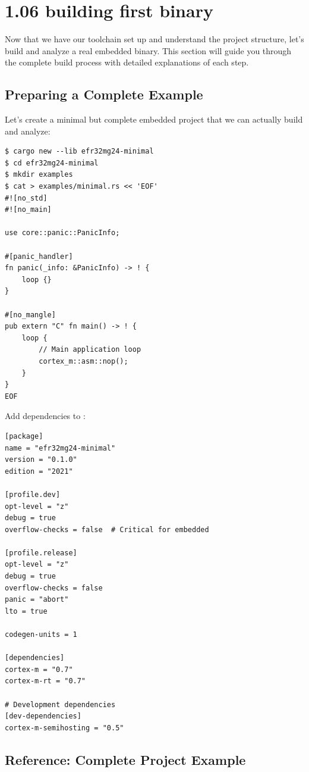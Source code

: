 \section{1.06 building first binary}
\label{sec:1.06 building first binary}


Now that we have our toolchain set up and understand the project structure, let's build and analyze a real embedded binary. This section will guide you through the complete build process with detailed explanations of each step.

\subsection{Preparing a Complete Example}
\label{sec:complete-example}

Let's create a minimal but complete embedded project that we can actually build and analyze:
\begin{verbatim}
$ cargo new --lib efr32mg24-minimal
$ cd efr32mg24-minimal
$ mkdir examples
$ cat > examples/minimal.rs << 'EOF'
#![no_std]
#![no_main]

use core::panic::PanicInfo;

#[panic_handler]
fn panic(_info: &PanicInfo) -> ! {
    loop {}
}

#[no_mangle]
pub extern "C" fn main() -> ! {
    loop {
        // Main application loop
        cortex_m::asm::nop();
    }
}
EOF
\end{verbatim}

Add dependencies to :\

\begin{verbatim}
[package]
name = "efr32mg24-minimal"
version = "0.1.0"
edition = "2021"

[profile.dev]
opt-level = "z"
debug = true
overflow-checks = false  # Critical for embedded

[profile.release]
opt-level = "z"
debug = true
overflow-checks = false
panic = "abort"
lto = true

codegen-units = 1

[dependencies]
cortex-m = "0.7"
cortex-m-rt = "0.7"

# Development dependencies
[dev-dependencies]
cortex-m-semihosting = "0.5"
\end{verbatim}

\subsection{Reference: Complete Project Example}
\label{subsec:reference-complete-project}

